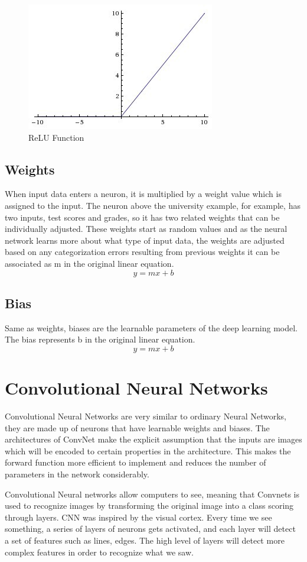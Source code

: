 \documentclass[12pt]{report}
\begin{document}
    \begin{figure} [h]
        \centering
        \includegraphics[width=.5\textwidth]{./images/relu.jpeg}
        \caption{ReLU Function}
        \label{fig:relu}
    \end{figure}

\subsection{Weights}
When input data enters a neuron, it is multiplied by a weight value which is assigned to the input. The neuron above the university example, 
for example, has two inputs, test scores and grades, so it has two related weights that can be individually adjusted.
These weights start as random values and as the neural network learns more about what type of input data, 
the weights are adjusted based on any categorization errors resulting from previous weights it can be associated as m in the original linear equation.
$$ y = mx + b$$


\subsection{Bias}
Same as weights, biases are the learnable parameters of the deep learning model.
The bias represents b in the original linear equation.
$$ y = mx + b $$

\section{Convolutional Neural Networks}
Convolutional Neural Networks are very similar to ordinary Neural Networks, 
they are made up of neurons that have learnable weights and biases.
The architectures of ConvNet make the explicit assumption that 
the inputs are images which will be encoded to certain properties in the architecture. 
This makes the forward function more efficient to implement and reduces the number of 
parameters in the network considerably.

Convolutional Neural networks allow computers to see, 
meaning that Convnets is used to recognize images by 
transforming the original image into a class scoring through layers.
CNN was inspired by the visual cortex.
Every time we see something, a series of layers of neurons gets activated, 
and each layer will detect a set of features such as lines, edges. 
The high level of layers will detect more complex features in order to recognize what we saw.
\end{document}
